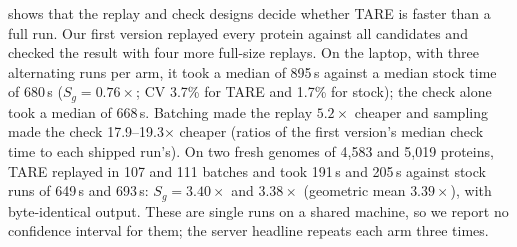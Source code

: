 \documentclass[letterpaper,twocolumn,10pt]{article}
\theoremstyle{definition}
\newcommand{\sys}{TARE\xspace}
\newcommand{\sys}{PARE\xspace}
\begin{document}
 shows that the replay and check designs decide whether \sys is faster than a full run. Our first
version replayed every protein against all candidates and checked the result with four more full\nobreakdash-size replays. On the laptop, with three alternating runs per arm, it took a median of 895\,s against a median stock time of 680\,s
($S_g = 0.76\times$; CV 3.7\% for \sys and 1.7\% for stock); the check alone took a median of 668\,s. Batching made the
replay $5.2\times$ cheaper and sampling made the check 17.9--19.3$\times$ cheaper (ratios of the first version's median check time to each shipped run's). On two fresh genomes of 4{,}583 and 5{,}019
proteins, \sys replayed in 107 and 111 batches and took 191\,s and 205\,s against stock runs of 649\,s and 693\,s: $S_g = 3.40\times$ and $3.38\times$
(geometric mean $3.39\times$), with byte\nobreakdash-identical output. These are single runs on a shared machine, so we report no
confidence interval for them; the server headline repeats each arm three times.
\end{document}
